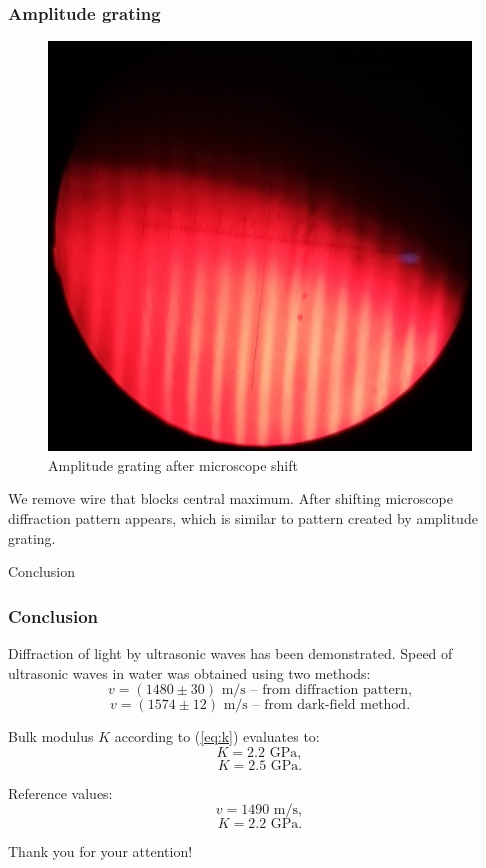 \documentclass{beamer}
\begin{document}
	\begin{frame}
		\frametitle{Amplitude grating}

		\begin{figure}
			\includegraphics[width=0.3\linewidth]{data/part2/moved.jpg}
			\caption{Amplitude grating after microscope shift}
		\end{figure}
	
		We remove wire that blocks central maximum. After shifting microscope diffraction pattern appears, which is similar to pattern created by amplitude grating.
		
	\end{frame}
	
	
	
	\begin{frame}[plain,c]
		
		\begin{center}
			\huge {} Conclusion
		\end{center}
		
	\end{frame}

	\begin{frame}
		\frametitle{Conclusion}
		
		Diffraction of light by ultrasonic waves has been demonstrated. Speed of ultrasonic waves in water was obtained using two methods:
		$$ v = (1480 \pm 30) \text{ m/s -- from diffraction pattern,}$$
		$$ v = (1574 \pm 12) \text{ m/s -- from dark-field method.}$$
		
		Bulk modulus $K$ according to (\ref{eq:k}) evaluates to:
		$$ K = 2.2 \text{ GPa},$$
		$$ K = 2.5 \text{ GPa}.$$
		
		Reference values:
		$$ v = 1490 \text{ m/s},$$
		$$ K = 2.2 \text{ GPa}. $$
	\end{frame}
	
	\begin{frame}[plain,c]
		
		\begin{center}
			\huge {} Thank you for your attention!
		\end{center}
		
	\end{frame}
			
	
\end{document}
